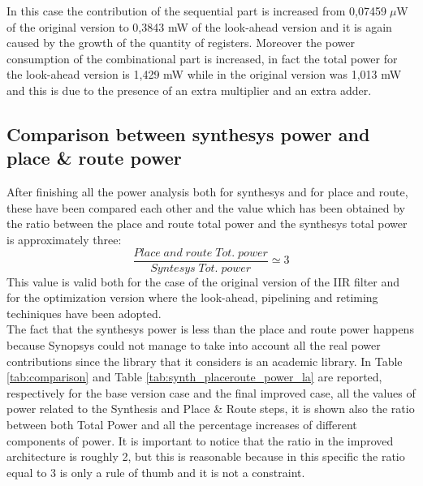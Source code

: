 \documentclass[a4paper, titlepage]{article}
\begin{document}
\noindent
In this case the contribution of the sequential part is increased from 0,07459$\;\mu$W of the original version to 0,3843 mW of the look-ahead version and it is again caused by the growth of the quantity of registers. Moreover the power consumption of the combinational part is increased, in fact the total power for the look-ahead version is 1,429 mW while in the original version was 1,013 mW and this is due to the presence of an extra multiplier and an extra adder.
\newpage
\subsection{Comparison between synthesys power and place \& route power}
After finishing all the power analysis both for synthesys and for place and route, these have been compared each other and the value which has been obtained by the ratio between the place and route total power and the synthesys total power is approximately three:
\begin{equation}
    \dfrac{Place\; and\; route\;  Tot. \;power}{Syntesys\; Tot. \;power} \simeq 3
\end{equation}
This value is valid both for the case of the original version of the IIR filter and for the optimization version where the look-ahead, pipelining and retiming techiniques have been adopted.\\The fact that the synthesys power is less than the place and route power happens because Synopsys could not manage to take into account all the real power contributions since the library that it considers is an academic library.
\newline
In Table \ref{tab:comparison} and Table \ref{tab:synth_placeroute_power_la} are reported, respectively for the base version case and the final improved case, all the values of power related to the Synthesis and Place \& Route steps, it is shown also the ratio between both Total Power and all the percentage increases of different components of power.
\newline
It is important to notice that the ratio in the improved architecture is roughly 2, but this is reasonable because in this specific the ratio equal to  3 is only a rule of thumb and it is not a constraint. 
\end{document}
